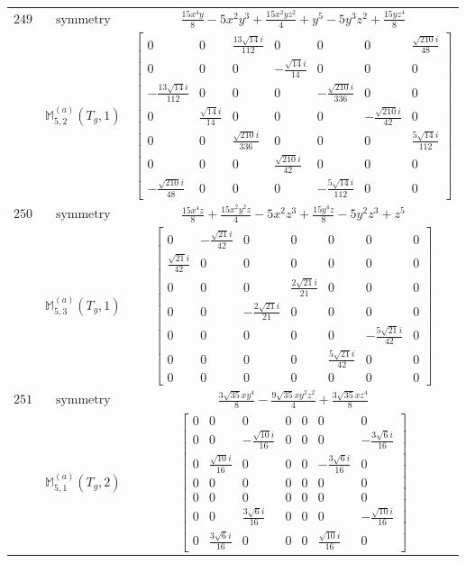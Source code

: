 \documentclass[fleqn,8pt,landscape]{jsarticle}
\begin{document}
\begin{longtable}{ccc}
$ 249 $ & $ \text{symmetry} $ & $ \frac{15 x^{4} y}{8} - 5 x^{2} y^{3} + \frac{15 x^{2} y z^{2}}{4} + y^{5} - 5 y^{3} z^{2} + \frac{15 y z^{4}}{8} $ \\
$  $ & $ \mathbb{M}_{5,2}^{(a)}(T_{g},1) $ & $ \begin{bmatrix} 0 & 0 & \frac{13 \sqrt{14} i}{112} & 0 & 0 & 0 & \frac{\sqrt{210} i}{48} \\ 0 & 0 & 0 & - \frac{\sqrt{14} i}{14} & 0 & 0 & 0 \\ - \frac{13 \sqrt{14} i}{112} & 0 & 0 & 0 & - \frac{\sqrt{210} i}{336} & 0 & 0 \\ 0 & \frac{\sqrt{14} i}{14} & 0 & 0 & 0 & - \frac{\sqrt{210} i}{42} & 0 \\ 0 & 0 & \frac{\sqrt{210} i}{336} & 0 & 0 & 0 & \frac{5 \sqrt{14} i}{112} \\ 0 & 0 & 0 & \frac{\sqrt{210} i}{42} & 0 & 0 & 0 \\ - \frac{\sqrt{210} i}{48} & 0 & 0 & 0 & - \frac{5 \sqrt{14} i}{112} & 0 & 0 \end{bmatrix} $ \\ \hline
$ 250 $ & $ \text{symmetry} $ & $ \frac{15 x^{4} z}{8} + \frac{15 x^{2} y^{2} z}{4} - 5 x^{2} z^{3} + \frac{15 y^{4} z}{8} - 5 y^{2} z^{3} + z^{5} $ \\
$  $ & $ \mathbb{M}_{5,3}^{(a)}(T_{g},1) $ & $ \begin{bmatrix} 0 & - \frac{\sqrt{21} i}{42} & 0 & 0 & 0 & 0 & 0 \\ \frac{\sqrt{21} i}{42} & 0 & 0 & 0 & 0 & 0 & 0 \\ 0 & 0 & 0 & \frac{2 \sqrt{21} i}{21} & 0 & 0 & 0 \\ 0 & 0 & - \frac{2 \sqrt{21} i}{21} & 0 & 0 & 0 & 0 \\ 0 & 0 & 0 & 0 & 0 & - \frac{5 \sqrt{21} i}{42} & 0 \\ 0 & 0 & 0 & 0 & \frac{5 \sqrt{21} i}{42} & 0 & 0 \\ 0 & 0 & 0 & 0 & 0 & 0 & 0 \end{bmatrix} $ \\ \hline
$ 251 $ & $ \text{symmetry} $ & $ \frac{3 \sqrt{35} x y^{4}}{8} - \frac{9 \sqrt{35} x y^{2} z^{2}}{4} + \frac{3 \sqrt{35} x z^{4}}{8} $ \\
$  $ & $ \mathbb{M}_{5,1}^{(a)}(T_{g},2) $ & $ \begin{bmatrix} 0 & 0 & 0 & 0 & 0 & 0 & 0 \\ 0 & 0 & - \frac{\sqrt{10} i}{16} & 0 & 0 & 0 & - \frac{3 \sqrt{6} i}{16} \\ 0 & \frac{\sqrt{10} i}{16} & 0 & 0 & 0 & - \frac{3 \sqrt{6} i}{16} & 0 \\ 0 & 0 & 0 & 0 & 0 & 0 & 0 \\ 0 & 0 & 0 & 0 & 0 & 0 & 0 \\ 0 & 0 & \frac{3 \sqrt{6} i}{16} & 0 & 0 & 0 & - \frac{\sqrt{10} i}{16} \\ 0 & \frac{3 \sqrt{6} i}{16} & 0 & 0 & 0 & \frac{\sqrt{10} i}{16} & 0 \end{bmatrix} $ \\ \hline

\end{longtable}
\end{document}
